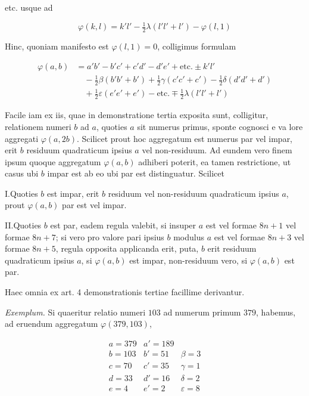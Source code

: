 etc. usque ad

\[
\varphi(k,l)=k'l'-\tfrac12\lambda(l'l'+l')-\varphi(l,1)
\]

Hinc, quoniam manifesto est $\varphi(l,1)=0$, colligimus formulam

\[
\begin{aligned}
\varphi(a,b)&=a'b'-b'c'+c'd'-d'e'+\text{etc.}\pm k'l'\\
&\quad-\tfrac12\beta(b'b'+b')+\tfrac12\gamma(c'c'+c')-\tfrac12\delta(d'd'+d')\\
&\quad+\tfrac12\varepsilon(e'e'+e')-\text{etc.}\mp\tfrac12\lambda(l'l'+l')
\end{aligned}
\]


Facile iam ex iis, quae in demonstratione tertia exposita sunt, colligitur, relationem numeri $b$ ad $a$, quoties $a$ sit numerus primus, sponte cognosci e va%
%
lore aggregati $\varphi(a,2b)$. Scilicet prout hoc aggregatum est numerus par vel impar, erit $b$ residuum quadraticum ipsius $a$ vel non-residuum. Ad eundem vero finem ipsum quoque aggregatum $\varphi(a,b)$ adhiberi poterit, ea tamen restrictione, ut casus ubi $b$ impar est ab eo ubi par est distinguatur. Scilicet

I.\quad Quoties $b$ est impar, erit $b$ residuum vel non-residuum quadraticum ipsius $a$, prout $\varphi(a,b)$ par est vel impar.

II.\quad Quoties $b$ est par, eadem regula valebit, si insuper $a$ est vel formae $8n+1$ vel formae $8n+7$; si vero pro valore pari ipsius $b$ modulus $a$ est vel formae $8n+3$ vel formae $8n+5$, regula opposita applicanda erit, puta, $b$ erit residuum quadraticum ipsius $a$, si $\varphi(a,b)$ est impar, non-residuum vero, si $\varphi(a,b)$ est par.

Haec omnia ex art. 4 demonstrationis tertiae facillime derivantur.


\textit{Exemplum.} Si quaeritur relatio numeri $103$ ad numerum primum $379$, habemus, ad eruendum aggregatum $\varphi(379,103)$,

\[
\begin{array}{r|r|l}
a=379&a'=189&\\
b=103&b'=51&\beta=3\\
c=70&c'=35&\gamma=1\\
d=33&d'=16&\delta=2\\
e=4&e'=2&\varepsilon=8
\end{array}
\]

